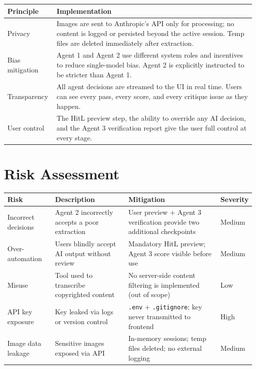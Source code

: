 \documentclass[12pt,a4paper]{article}
\begin{document}
\begin{center}
\begin{tabular}{lp{10cm}}
  \toprule
  \textbf{Principle} & \textbf{Implementation} \\
  \midrule
  Privacy         & Images are sent to Anthropic's API only for processing; no content is
                    logged or persisted beyond the active session. Temp files are deleted
                    immediately after extraction. \\[0.4em]
  Bias mitigation & Agent 1 and Agent 2 use different system roles and incentives to reduce
                    single-model bias. Agent 2 is explicitly instructed to be stricter than
                    Agent 1. \\[0.4em]
  Transparency    & All agent decisions are streamed to the UI in real time. Users can see
                    every pass, every score, and every critique issue as they happen. \\[0.4em]
  User control    & The HitL preview step, the ability to override any AI decision, and the
                    Agent 3 verification report give the user full control at every stage. \\
  \bottomrule
\end{tabular}
\end{center}


\section{Risk Assessment}

\begin{center}
\begin{tabular}{p{3.5cm}p{4cm}p{4.5cm}l}
  \toprule
  \textbf{Risk} & \textbf{Description} & \textbf{Mitigation} & \textbf{Severity} \\
  \midrule
  Incorrect decisions &
    Agent 2 incorrectly accepts a poor extraction &
    User preview + Agent 3 verification provide two additional checkpoints &
    Medium \\[0.4em]
  Over-automation &
    Users blindly accept AI output without review &
    Mandatory HitL preview; Agent 3 score visible before use &
    Medium \\[0.4em]
  Misuse &
    Tool used to transcribe copyrighted content &
    No server-side content filtering is implemented (out of scope) &
    Low \\[0.4em]
  API key exposure &
    Key leaked via logs or version control &
    \texttt{.env} + \texttt{.gitignore}; key never transmitted to frontend &
    High \\[0.4em]
  Image data leakage &
    Sensitive images exposed via API &
    In-memory sessions; temp files deleted; no external logging &
    Medium \\
  \bottomrule
\end{tabular}
\end{center}
\end{document}
